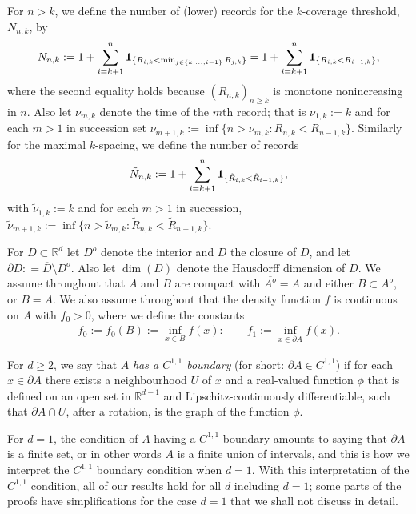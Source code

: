 \documentclass[12pt]{article}
\newcommand{\tN}{{\tilde{N}}}
\newcommand{\tnu}{{\tilde{\nu}}}
\newcommand{\tR}{{\tilde{R}}}
\newcommand{\R}{\mathbb{R}}
\begin{document}
For $n > k$, we define the number of (lower)
records for the $k$-coverage threshold, $N_{n,k}$, by
\begin{align*}
N_{n,k} :=  1+
	\sum_{i = k+1}^n {\bf 1}_{\{R_{i,k} < \min_{j \in \{k,\ldots,i-1\}}
	R_{j,k}\}}
= 
1 + \sum_{i = k+1}^n {\bf 1}_{\{R_{i,k} < R_{i-1,k}\}},
\end{align*}
where the second equality holds because $(R_{n,k})_{n \geq k}$ is
 monotone nonincreasing in $n$.
Also let $\nu_{m,k}$ denote the time of the $m$th record; that is
$\nu_{1,k} := k$ and for each $m >1$ in succession set
 $\nu_{m+1,k} := \inf\{n > \nu_{m,k}: R_{n,k} < R_{n-1,k}\}$.
 Similarly for the maximal $k$-spacing, we define the number of records 
$$
\tN_{n,k} := 1 + \sum_{i = k+1}^n {\bf 1}_{\{\tR_{i,k} < \tR_{i-1,k}\}},
$$
with
$\tnu_{1,k} :=k $ and for each $m >1$
in succession,
 $\tnu_{m+1,k} := \inf\{n > \tnu_{m,k}: \tR_{n,k} < \tR_{n-1,k}\}$.

For $D \subset \R^d$
let $D^o$ denote the interior and $\overline{D}$ the closure of $D$,
and let $\partial D: = \overline{D} \setminus D^o$.
Also let $\dim(D)$ denote the Hausdorff dimension of $D$.
We assume throughout that 
$A$ and $B$ are compact with
$\overline{A^o} = A$ and
  either %
 $B \subset A^o$, or $B=A$.
 We also assume throughout that the density function $f$ is continuous on $A$
 with $f_0 >0$, where 
 we define the constants
 \begin{align}
 f_0:= f_0(B) := \inf_{x \in B} f(x): ~~~~~~~~~
 f_1:=  \inf_{x \in \partial A} f(x).
	 \label{e:f0f1def}
 \end{align}

 For $d \geq 2$,
we say that $A$ {\em has a $C^{1,1}$ boundary} (for short: $\partial A \in
C^{1,1}$) if
for each $x \in \partial A$
there exists a neighbourhood $U$ of $x$ and a real-valued function $\phi$ that
is  defined on an open set in $\R^{d-1}$
and Lipschitz-continuously differentiable, such
that  $\partial A \cap U$, after a rotation, is the graph of the
function $\phi$.

For $d=1$, the condition of $A$ having a $C^{1,1}$ boundary amounts
to saying that $\partial A$ is a finite set, or in other words $A$
is a finite union of intervals, and this is how we interpret the
$C^{1,1}$ boundary condition when $d=1$. With this interpretation of
the $C^{1,1}$ condition, all of our results hold for all $d$ including $d=1$; some parts of the proofs have simplifications for the case $d=1$ that we shall not discuss in detail.
\end{document}

